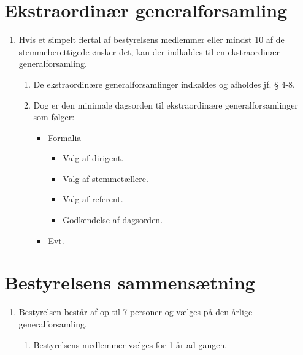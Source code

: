 \documentclass[a4paper]{article}
\newenvironment{stykenum}{
  \begin{enumerate}[%
    label=Stk.~\arabic*., ref=\theenumi~Stk.~\arabic*, start=2]
}{\end{enumerate}}
\begin{document}
\section*{Ekstraordinær generalforsamling}

\begin{enumerate}[resume*=afsnit]

\item Hvis et simpelt flertal af bestyrelsens medlemmer eller mindst 10 af de
stemmeberettigede ønsker det, kan der indkaldes til en ekstraordinær
generalforsamling.

  \begin{stykenum}

  \item De ekstraordinære generalforsamlinger indkaldes og afholdes jf. § 4-8.

  \item Dog er den minimale dagsorden til ekstraordinære generalforsamlinger
        som følger:

        \begin{itemize}
        \item Formalia
          \begin{itemize}
          \item Valg af dirigent.
          \item Valg af stemmetællere.
          \item Valg af referent.
          \item Godkendelse af dagsorden.
          \end{itemize}
        \item Evt.
        \end{itemize}

  \end{stykenum}

\end{enumerate}


\section*{Bestyrelsens sammensætning}

\begin{enumerate}[resume*=afsnit]

\item Bestyrelsen består af op til 7 personer og vælges på den årlige
generalforsamling.

  \begin{stykenum}

  \item Bestyrelsens medlemmer vælges for 1 år ad gangen.

  \end{stykenum}

\end{enumerate}
\end{document}

